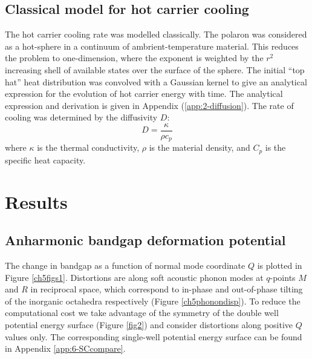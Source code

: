 \subsection{Classical model for hot carrier cooling}
The hot carrier cooling rate was modelled classically. The polaron was considered as a hot-sphere in a continuum of ambrient-temperature material. This reduces the problem to one-dimension, where the exponent is weighted by the $r^2$ increasing shell of available states over the surface of the sphere. 
The initial “top hat” heat distribution was convolved with a Gaussian kernel to give an analytical expression for the evolution of hot carrier energy with time. The analytical expression and derivation is given in Appendix (\ref{app:2-diffusion}).
The rate of cooling was determined by the diffusivity $D$:
\begin{equation}
    D = \frac{\kappa}{\rho c_p}
\end{equation}
where $\kappa$ is the thermal conductivity, $\rho$ is the material density, and $C_p$ is the specific heat capacity.

\section{Results}
\subsection{Anharmonic bandgap deformation potential}
The change in bandgap as a function of normal mode coordinate $Q$ is plotted in Figure \ref{ch5figs1}. Distortions are along soft acoustic phonon modes at $q$-points $M$ and $R$ in reciprocal space, which correspond to in-phase and out-of-phase tilting of the inorganic octahedra respectively (Figure \ref{ch5phonondisp}).
To reduce the computational cost we take advantage of the symmetry of the double well potential energy surface (Figure \ref{fig2}) and consider distortions along positive $Q$ values only. The corresponding single-well potential energy surface can be found in Appendix \ref{app:6-SCcompare}.

